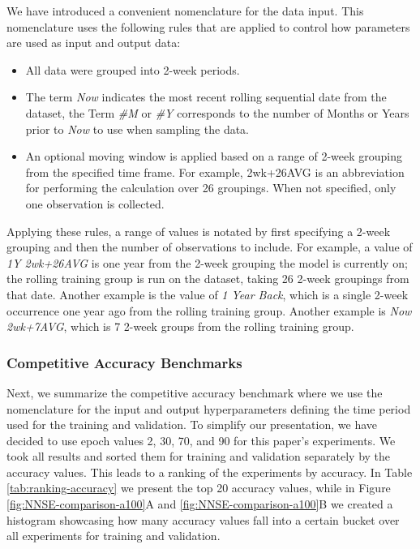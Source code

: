 \documentclass[utf8]{FrontiersinVancouver} %
\begin{document}
We have introduced a convenient nomenclature for the data input. This nomenclature uses the following rules that are applied to control how parameters are used as input and output data:

\begin{itemize}
  \item All data were grouped into 2-week periods.
  \item The term {\em Now} indicates the most recent rolling    sequential date from the dataset, the Term {\em \#M} or {\em \#Y}    corresponds to the number of Months or Years prior to {\em Now} to    use when sampling the data.
  \item An optional moving window is applied based on a range of    2-week grouping from the specified time frame.  For example,    2wk+26AVG is an abbreviation for performing the calculation over    26 groupings.  When not specified, only one observation is    collected.
\end{itemize}



Applying these rules, a range of values is notated by first specifying a 2-week grouping and then the number of observations to include. For example, a value of {\em 1Y 2wk+26AVG} is one year from the 2-week grouping the model is currently on; the rolling training group is run on the dataset, taking 26 2-week groupings from that date. Another example is the value of {\em 1 Year Back}, which is a single 2-week occurrence one year ago from the rolling training group. Another example is {\em Now 2wk+7AVG}, which is 7 2-week groups from the rolling training group.


\subsubsection{Competitive Accuracy Benchmarks}

Next, we summarize the competitive accuracy benchmark where we use the nomenclature for the input and output hyperparameters defining the time period used for the training and validation.  To simplify our presentation, we have decided to use epoch values 2, 30, 70, and 90 for this paper's experiments. We took all results and sorted them for training and validation separately by the accuracy values. This leads to a ranking of the experiments by accuracy. In Table \ref{tab:ranking-accuracy} we present the top 20 accuracy values, while in Figure \ref{fig:NNSE-comparison-a100}A and \ref{fig:NNSE-comparison-a100}B we created a histogram showcasing how many accuracy values fall into a certain bucket over all experiments for training and validation.
\end{document}
